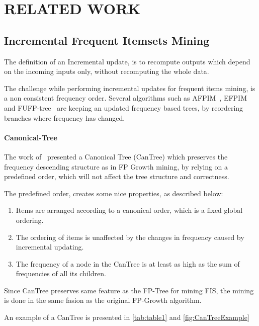 \section{RELATED WORK}

\subsection{Incremental Frequent Itemsets Mining}
The definition of an Incremental update, is to recompute outputs which depend on the incoming inputs only, without recomputing the whole data.

The challenge while performing incremental updates for frequent items mining, is a non consistent frequency order. Several algorithms such as AFPIM~\cite{koh2004efficient}, EFPIM~\cite{li2006fast} and FUFP-tree~\cite{hong2008incrementally} are keeping an updated frequency based trees, by reordering branches where frequency has changed. 

\paragraph{Canonical-Tree}
The work of~\cite{leung2005cantree} presented a Canonical Tree (CanTree) which preserves the frequency descending structure as in FP Growth mining, by relying on a predefined order, which will not affect the tree structure and correctness.

The predefined order, creates some nice properties, as described below:

\begin{enumerate}
	\item Items are arranged according to a canonical order, which is a fixed
global ordering.
	\item The ordering of items is unaffected by the changes in frequency
caused by incremental updating.
	\item The frequency of a node in the CanTree is at least as high as the sum
of frequencies of all its children.
\end{enumerate}

Since CanTree preserves same feature as the FP-Tree for mining FIS, the mining is done in the same fasion as the original FP-Growth algorithm.

An example of a CanTree is presented in \autoref{tab:table1} and \autoref{fig:CanTreeExample}

